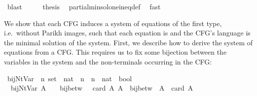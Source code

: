 \begin{isabellebody}
\ blast\isanewline
\ \ \isamarkupfalse%
\ \isamarkupfalse%
\ {\isacharquery}{\kern0pt}thesis\ \isamarkupfalse%
\ partial{\isacharunderscore}{\kern0pt}min{\isacharunderscore}{\kern0pt}sol{\isacharunderscore}{\kern0pt}one{\isacharunderscore}{\kern0pt}ineq{\isacharunderscore}{\kern0pt}def\ \isamarkupfalse%
\ fast\isanewline
{}\isamarkupfalse%
%
\endisatagproof
{\isafoldproof}%
%
\isadelimproof
%
\endisadelimproof
%
\isadelimdocument
%
\endisadelimdocument
%
\isatagdocument
%
\isamarkuptrue%
%
\endisatagdocument
{\isafolddocument}%
%
\isadelimdocument
%
\endisadelimdocument
%
\begin{isamarkuptext}%
\label{sec:cfl_as_eqns_sys}%
\end{isamarkuptext}\isamarkuptrue%
%
\begin{isamarkuptext}%
We show that each CFG induces a system of equations of the first type, i.e.\ without Parikh images,
such that each equation is  and the CFG's language is the minimal solution of the system.
First, we describe how to derive the system of equations from a CFG. This requires us to fix some
bijection between the variables in the system and the non-terminals occurring in the CFG:%
\end{isamarkuptext}\isamarkuptrue%
\isamarkupfalse%
\ bij{\isacharunderscore}{\kern0pt}Nt{\isacharunderscore}{\kern0pt}Var\ {\isacharcolon}{\kern0pt}{\isacharcolon}{\kern0pt}\ {\isachardoublequoteopen}{\isacharprime}{\kern0pt}n\ set\ {\isasymRightarrow}\ {\isacharparenleft}{\kern0pt}nat\ {\isasymRightarrow}\ {\isacharprime}{\kern0pt}n{\isacharparenright}{\kern0pt}\ {\isasymRightarrow}\ {\isacharparenleft}{\kern0pt}{\isacharprime}{\kern0pt}n\ {\isasymRightarrow}\ nat{\isacharparenright}{\kern0pt}\ {\isasymRightarrow}\ bool{\isachardoublequoteclose}\ \isanewline
\ \ {\isachardoublequoteopen}bij{\isacharunderscore}{\kern0pt}Nt{\isacharunderscore}{\kern0pt}Var\ A\ {\isasymgamma}\ {\isasymgamma}{\isacharprime}{\kern0pt}\ {\isasymequiv}\ bij{\isacharunderscore}{\kern0pt}betw\ {\isasymgamma}\ {\isacharbraceleft}{\kern0pt}{\isachardot}{\kern0pt}{\isachardot}{\kern0pt}{\isacharless}{\kern0pt}\ card\ A{\isacharbraceright}{\kern0pt}\ A\ {\isasymand}\ bij{\isacharunderscore}{\kern0pt}betw\ {\isasymgamma}{\isacharprime}{\kern0pt}\ A\ {\isacharbraceleft}{\kern0pt}{\isachardot}{\kern0pt}{\isachardot}{\kern0pt}{\isacharless}{\kern0pt}\ card\ A{\isacharbraceright}{\kern0pt}\isanewline

\end{isabellebody}
